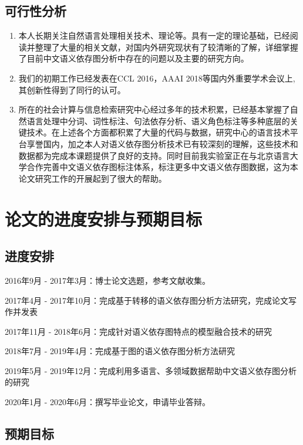 \subsection{可行性分析}
\begin{enumerate}
	\item 本人长期关注自然语言处理相关技术、理论等。具有一定的理论基础，已经阅读并整理了大量的相关文献，对国内外研究现状有了较清晰的了解，详细掌握了目前中文语义依存图分析中存在的问题以及主要的研究方向。
	
	\item 我们的初期工作已经发表在CCL 2016，AAAI 2018等国内外重要学术会议上,其创新性得到了同行的认可。
	
	\item 所在的社会计算与信息检索研究中心经过多年的技术积累，已经基本掌握了自然语言处理中分词、词性标注、句法依存分析、语义角色标注等多种底层的关键技术。在上述各个方面都积累了大量的代码与数据，研究中心的语言技术平台享誉国内，加之本人对语义依存图分析技术已有较深刻的理解，这些技术和数据都为完成本课题提供了良好的支持。同时目前我实验室正在与北京语言大学合作完善中文语义依存图标注体系，标注更多中文语义依存图数据，这为本论文研究工作的开展起到了很大的帮助。
	
	
\end{enumerate}
\section{论文的进度安排与预期目标}

\subsection{进度安排}

2016年9月 - 2017年3月：博士论文选题，参考文献收集。

2017年4月 - 2017年10月：完成基于转移的语义依存图分析方法研究，完成论文写作并发表

2017年11月 - 2018年6月：完成针对语义依存图特点的模型融合技术的研究

2018年7月 - 2019年4月：完成基于图的语义依存图分析方法研究

2019年5月 - 2019年12月：完成利用多语言、多领域数据帮助中文语义依存图分析的研究

2020年1月 - 2020年6月：撰写毕业论文，申请毕业答辩。


\subsection{预期目标}

